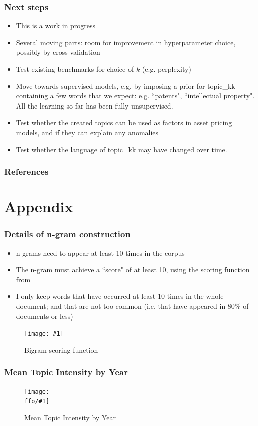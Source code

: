 \documentclass{beamer}
\newcommand{\ffo}{dicfullmc10thr10defnob40noa0_8_4t}
\newcommand{\insertfigurenoffo}[3]{
\begin{figure}[h!]
  \centering
  \texttt{[image: \#1]}
  \caption{#2}
  \label{fig:#1}
\end{figure}
}
\newcommand{\insertfigure}[2]{
\begin{figure}[h!]
  \centering
  \texttt{[image: \\ffo/\#1]}
  \centering
  \captionsetup{font=scriptsize}
  \caption{#2}
  \label{fig:#1}
\end{figure}
}
\begin{document}
\begin{frame}
\frametitle{Next steps}
\begin{itemize}
\item This is a work in progress
\item Several moving parts: room for improvement in hyperparameter choice, possibly by cross-validation
\item Test existing benchmarks for choice of $k$ (e.g. perplexity)
\item Move towards supervised models, e.g. by imposing a prior for topic\_kk containing a few words that we expect: e.g. ``patents", ``intellectual property". All the learning so far has been fully unsupervised. 
\item Test whether the created topics can be used as factors in asset pricing models, and if they can explain any anomalies
\item Test whether the language of topic\_kk may have changed over time.
\end{itemize}
\end{frame}


\begin{frame}[allowframebreaks]
\frametitle{References}

\end{frame}

\section{Appendix}

\begin{frame}
\frametitle{Details of n-gram construction}
\label{ngram_details}
\begin{itemize}
\item n-grams need to appear at least 10 times in the corpus
\item The n-gram must achieve a ``score" of at least 10, using the scoring function from \cite{Mikolov2013-be} \hyperlink{ngram_main}{}
\item I only keep words that have occurred at least 10 times in the whole document; and that are not too common (i.e. that have appeared in 80\% of documents or less)
\end{itemize}
\insertfigurenoffo{mikolov_formula}{Bigram scoring function}{0.3}
\end{frame}

\begin{frame}
\frametitle{Mean Topic Intensity by Year}
\label{meantiy_details}
\hyperlink{results}{}
\insertfigure{mean_tiy}{Mean Topic Intensity by Year}
\end{frame}
\end{document}
